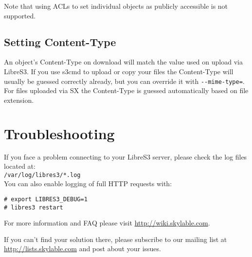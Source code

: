 Note that using ACLs to set individual objects as publicly accessible
is not supported.

\section{Setting Content-Type}

An object's Content-Type on download will match the value used on upload
via LibreS3.
If you use s3cmd to upload or copy your files the Content-Type will usually be guessed
correctly already, but you can override it with \verb|--mime-type=|.
For files uploaded via SX the Content-Type is guessed automatically based on
file extension.

\chapter{Troubleshooting}
If you face a problem connecting to your LibreS3 server, please check
the log files located at:\\ \verb|/var/log/libres3/*.log|\\
You can also enable logging of full HTTP requests with:

\begin{lstlisting}
# export LIBRES3_DEBUG=1
# libres3 restart
\end{lstlisting}

For more information and FAQ please visit \url{http://wiki.skylable.com}.

If you can't find your solution there, please subscribe to our mailing list
at \url{http://lists.skylable.com} and post about your issues.

